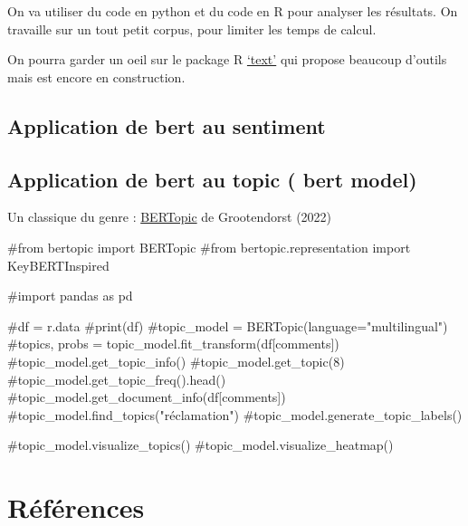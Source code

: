 \documentclass[
  letterpaper,
  DIV=11,
  numbers=noendperiod]{scrreprt}
\newenvironment{Shaded}{\begin{snugshade}}{\end{snugshade}}
\newcommand{\CommentTok}[1]{\textcolor[rgb]{0.37,0.37,0.37}{#1}}
\begin{document}
On va utiliser du code en python et du code en R pour analyser les
résultats. On travaille sur un tout petit corpus, pour limiter les temps
de calcul.

On pourra garder un oeil sur le package R
\href{https://www.r-text.org/index.html}{`text'} qui propose beaucoup
d'outils mais est encore en construction.

\subsection{Application de bert au
sentiment}\label{application-de-bert-au-sentiment}

\subsection{Application de bert au topic ( bert
model)}\label{application-de-bert-au-topic-bert-model}

Un classique du genre :
\href{https://maartengr.github.io/BERTopic/index.html}{BERTopic} de
Grootendorst (2022)

\begin{Shaded}
\begin{Highlighting}[]

\CommentTok{\#from bertopic import BERTopic}
\CommentTok{\#from bertopic.representation import KeyBERTInspired}

\CommentTok{\#import pandas as pd}

\CommentTok{\#df = r.data}
\CommentTok{\#print(df)}
\CommentTok{\#topic\_model = BERTopic(language="multilingual")}
\CommentTok{\#topics, probs = topic\_model.fit\_transform(df[\textquotesingle{}comments\textquotesingle{}])}
\CommentTok{\#topic\_model.get\_topic\_info()}
\CommentTok{\#topic\_model.get\_topic(8)}
\CommentTok{\#topic\_model.get\_topic\_freq().head()}
\CommentTok{\#topic\_model.get\_document\_info(df[\textquotesingle{}comments\textquotesingle{}])}
\CommentTok{\#topic\_model.find\_topics("réclamation")}
\CommentTok{\#topic\_model.generate\_topic\_labels()}

\CommentTok{\#topic\_model.visualize\_topics()}
\CommentTok{\#topic\_model.visualize\_heatmap()}
\end{Highlighting}
\end{Shaded}

\section{Références}\label{ruxe9fuxe9rences-3}
\end{document}
